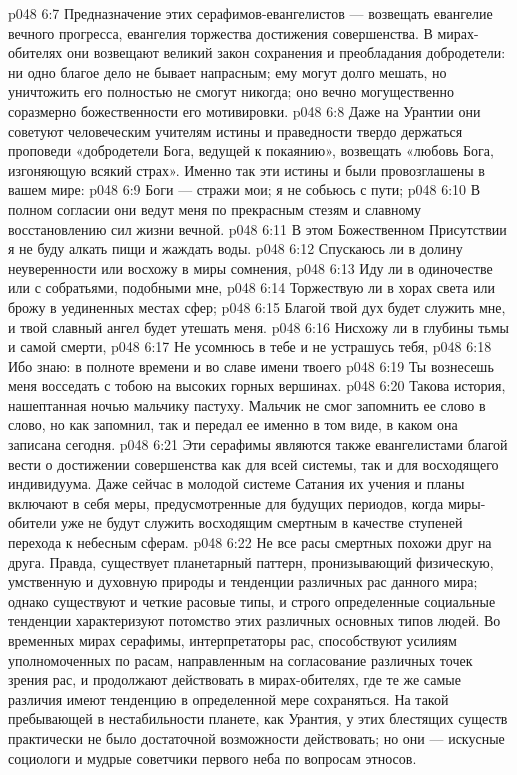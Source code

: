 \vs p048 6:7 \pc Предназначение этих серафимов\hyp{}евангелистов --- возвещать евангелие вечного прогресса, евангелия торжества достижения совершенства. В мирах\hyp{}обителях они возвещают великий закон сохранения и преобладания добродетели: ни одно благое дело не бывает напрасным; ему могут долго мешать, но уничтожить его полностью не смогут никогда; оно вечно могущественно соразмерно божественности его мотивировки.
\vs p048 6:8 Даже на Урантии они советуют человеческим учителям истины и праведности твердо держаться проповеди «добродетели Бога, ведущей к покаянию», возвещать «любовь Бога, изгоняющую всякий страх». Именно так эти истины и были провозглашены в вашем мире:
\vs p048 6:9 Боги --- стражи мои; я не собьюсь с пути;
\vs p048 6:10 В полном согласии они ведут меня по прекрасным стезям и славному восстановлению сил жизни вечной.
\vs p048 6:11 В этом Божественном Присутствии я не буду алкать пищи и жаждать воды.
\vs p048 6:12 Спускаюсь ли в долину неуверенности или восхожу в миры сомнения,
\vs p048 6:13 Иду ли в одиночестве или с собратьями, подобными мне,
\vs p048 6:14 Торжествую ли в хорах света или брожу в уединенных местах сфер;
\vs p048 6:15 Благой твой дух будет служить мне, и твой славный ангел будет утешать меня.
\vs p048 6:16 Нисхожу ли в глубины тьмы и самой смерти,
\vs p048 6:17 Не усомнюсь в тебе и не устрашусь тебя,
\vs p048 6:18 Ибо знаю: в полноте времени и во славе имени твоего
\vs p048 6:19 Ты вознесешь меня восседать с тобою на высоких горных вершинах.
\vs p048 6:20 \pc Такова история, нашептанная ночью мальчику пастуху. Мальчик не смог запомнить ее слово в слово, но как запомнил, так и передал ее именно в том виде, в каком она записана сегодня.
\vs p048 6:21 Эти серафимы являются также евангелистами благой вести о достижении совершенства как для всей системы, так и для восходящего индивидуума. Даже сейчас в молодой системе Сатания их учения и планы включают в себя меры, предусмотренные для будущих периодов, когда миры\hyp{}обители уже не будут служить восходящим смертным в качестве ступеней перехода к небесным сферам.
\vs p048 6:22 \pc {}\bibnobreakspace {} Не все расы смертных похожи друг на друга. Правда, существует планетарный паттерн, пронизывающий физическую, умственную и духовную природы и тенденции различных рас данного мира; однако существуют и четкие расовые типы, и строго определенные социальные тенденции характеризуют потомство этих различных основных типов людей. Во временных мирах серафимы, интерпретаторы рас, способствуют усилиям уполномоченных по расам, направленным на согласование различных точек зрения рас, и продолжают действовать в мирах\hyp{}обителях, где те же самые различия имеют тенденцию в определенной мере сохраняться. На такой пребывающей в нестабильности планете, как Урантия, у этих блестящих существ практически не было достаточной возможности действовать; но они --- искусные социологи и мудрые советчики первого неба по вопросам этносов.
